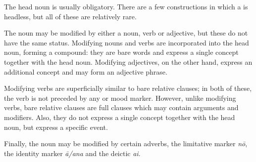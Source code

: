 The head noun is usually obligatory. There are a few constructions in which a  is headless, but all of these are relatively rare.

The noun may be modified by either a noun, verb or adjective, but these do not have the same status. Modifying nouns and verbs are incorporated into the head noun, forming a compound: they are bare words and express a single concept together with the head noun. Modifying adjectives, on the other hand, express an additional concept and may form an adjective phrase.

Modifying verbs are superficially similar to bare relative clauses; in both of these, the verb is not preceded by any  or mood marker. However, unlike modifying verbs, bare relative clauses are full clauses which may contain arguments and modifiers. Also, they do not express a single concept together with the head noun, but express a specific event.

Finally, the noun may be modified by certain adverbs, the limitative marker \textit{nō}, the identity marker \textit{{\ꞌ}ā/{\ꞌ}ana} and the deictic  \textit{ai}.
